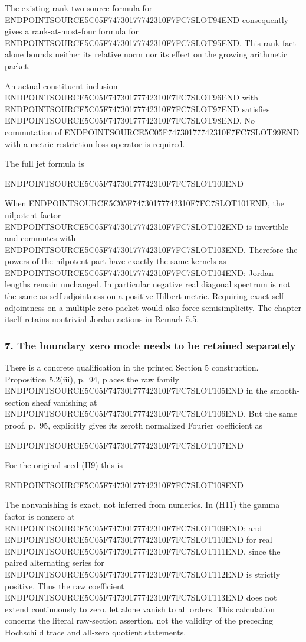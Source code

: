 The existing rank-two source formula for ENDPOINTSOURCE5C05F74730177742310F7FC7SLOT94END consequently gives a rank-at-most-four formula for ENDPOINTSOURCE5C05F74730177742310F7FC7SLOT95END. This rank fact alone bounds neither its relative norm nor its effect on the growing arithmetic packet.

An actual constituent inclusion ENDPOINTSOURCE5C05F74730177742310F7FC7SLOT96END with ENDPOINTSOURCE5C05F74730177742310F7FC7SLOT97END satisfies ENDPOINTSOURCE5C05F74730177742310F7FC7SLOT98END. No commutation of ENDPOINTSOURCE5C05F74730177742310F7FC7SLOT99END with a metric restriction-loss operator is required.

The full jet formula is

ENDPOINTSOURCE5C05F74730177742310F7FC7SLOT100END

When ENDPOINTSOURCE5C05F74730177742310F7FC7SLOT101END, the nilpotent factor ENDPOINTSOURCE5C05F74730177742310F7FC7SLOT102END is invertible and commutes with ENDPOINTSOURCE5C05F74730177742310F7FC7SLOT103END. Therefore the powers of the nilpotent part have exactly the same kernels as ENDPOINTSOURCE5C05F74730177742310F7FC7SLOT104END: Jordan lengths remain unchanged. In particular negative real diagonal spectrum is not the same as self-adjointness on a positive Hilbert metric. Requiring exact self-adjointness on a multiple-zero packet would also force semisimplicity. The chapter itself retains nontrivial Jordan actions in Remark 5.5.

\subsubsection{7. The boundary zero mode needs to be retained separately}\label{endpoint-cc_hochschild--the-boundary-zero-mode-needs-to-be-retained-separately}

There is a concrete qualification in the printed Section 5 construction. Proposition 5.2(iii), p.~94, places the raw family ENDPOINTSOURCE5C05F74730177742310F7FC7SLOT105END in the smooth-section sheaf vanishing at ENDPOINTSOURCE5C05F74730177742310F7FC7SLOT106END. But the same proof, p.~95, explicitly gives its zeroth normalized Fourier coefficient as

ENDPOINTSOURCE5C05F74730177742310F7FC7SLOT107END

For the original seed (H9) this is

ENDPOINTSOURCE5C05F74730177742310F7FC7SLOT108END

The nonvanishing is exact, not inferred from numerics. In (H11) the gamma factor is nonzero at ENDPOINTSOURCE5C05F74730177742310F7FC7SLOT109END; and ENDPOINTSOURCE5C05F74730177742310F7FC7SLOT110END for real ENDPOINTSOURCE5C05F74730177742310F7FC7SLOT111END, since the paired alternating series for ENDPOINTSOURCE5C05F74730177742310F7FC7SLOT112END is strictly positive. Thus the raw coefficient ENDPOINTSOURCE5C05F74730177742310F7FC7SLOT113END does not extend continuously to zero, let alone vanish to all orders. This calculation concerns the literal raw-section assertion, not the validity of the preceding Hochschild trace and all-zero quotient statements.

